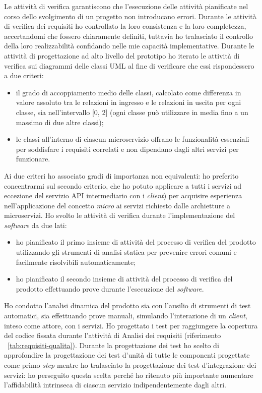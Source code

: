 Le attività di verifica garantiscono che l'esecuzione delle attività pianificate nel corso dello svolgimento di un progetto non introducano errori.
Durante le attività di verifica dei requisiti ho controllato la loro consistenza e la loro completezza, accertandomi che fossero chiaramente definiti, tuttavia ho tralasciato il controllo della loro realizzabilità confidando nelle mie capacità implementative.
Durante le attività di progettazione ad alto livello del prototipo ho iterato le attività di verifica sui diagrammi delle classi UML al fine di verificare che essi rispondessero a due criteri:
\begin{itemize}
  \item il grado di accoppiamento medio delle classi, calcolato come differenza in valore assoluto tra le relazioni in ingresso e le relazioni in uscita per ogni classe, sia nell'intervallo [0, 2] (ogni classe può utilizzare in media fino a un massimo di due altre classi);
  \item le classi all'interno di ciascun microservizio offrano le funzionalità essenziali per soddisfare i requisiti correlati e non dipendano dagli altri servizi per funzionare.
\end{itemize}
Ai due criteri ho associato gradi di importanza non equivalenti: ho preferito concentrarmi sul secondo criterio, che ho potuto applicare a tutti i servizi ad eccezione del servizio API intermediario con i \emph{client}) per acquisire esperienza nell'applicazione del concetto \emph{micro} ai servizi richiesto dalle archietture a microservizi.
Ho svolto le attività di verifica durante l'implementazione del \emph{software} da due lati:
\begin{itemize}
  \item ho pianificato il primo insieme di attività del processo di verifica del prodotto utilizzando gli strumenti di analisi statica per prevenire errori comuni e facilmente risolvibili automaticamente;
  \item ho pianificato il secondo insieme di attività del processo di verifica del prodotto effettuando prove durante l'esecuzione del \emph{software}.
\end{itemize}
Ho condotto l'analisi dinamica del prodotto sia con l'ausilio di strumenti di test automatici, sia effettuando prove manuali, simulando l'interazione di un \emph{client}, inteso come attore, con i servizi.
Ho progettato i test per raggiungere la copertura del codice fissata durante l'attività di Analisi dei requisiti (riferimento ~\ref{tab:requisiti-qualita}).
Durante la progettazione dei test ho scelto di approfondire la progettazione dei test d'unità di tutte le componenti progettate come primo \emph{step} mentre ho tralasciato la progettazione dei test d'integrazione dei servizi: ho perseguito questa scelta perché ho ritenuto più importante aumentare l'affidabilità intrinseca di ciascun servizio indipendentemente dagli altri.
